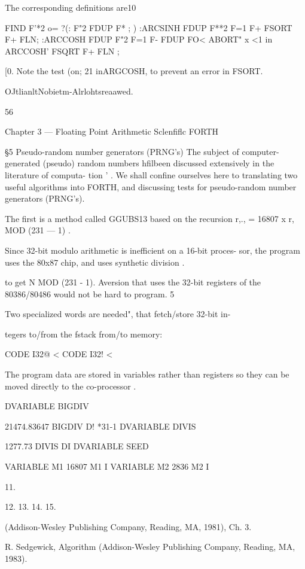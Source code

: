 The corresponding definitions are10

FIND F'*2 o= ?(: F"2 FDUP F* ; )
:ARCSINH FDUP F**2 F=1 F+
FSORT F+ FLN;
:ARCCOSH FDUP F"2 F=1 F-
FDUP FO<
ABORT" x <1 in ARCCOSH'
FSQRT F+ FLN ;

 

[0. Note the test (on; 21 inARGCOSH, to prevent an error in FSORT.

OJtlianltNobietm-Alrlohtsreaawed.

56

Chapter 3 — Floating Point Arithmetic Sclenfiﬂc FORTH

§5 Pseudo-random number generators (PRNG's)
The subject of computer-generated (pseudo) random numbers
hfilbeen discussed extensively in the literature of computa-
tion ' . We shall confine ourselves here to translating two useful
algorithms into FORTH, and discussing tests for pseudo-random
number generators (PRNG’s).

The first is a method called GGUBS13 based on the recursion
r,., = 16807 x r, MOD (231 — 1) .

Since 32-bit modulo arithmetic is inefficient on a 16-bit proces-
sor, the program uses the 80x87 chip, and uses synthetic division .

to get N MOD (231 - 1). Aversion that uses the 32-bit registers
of the 80386/80486 would not be hard to program. 5

 

Two specialized words are needed", that fetch/store 32-bit in-

tegers to/from the fstack from/to memory:

CODE I32@ <%
CODE I32! < %

The program data are stored in variables rather than registers so
they can be moved directly to the co-processor .

DVARIABLE BIGDIV

21474.83647 BIGDIV D! \2**31-1
DVARIABLE DIVIS

1277.73 DIVIS DI
DVARIABLE SEED

VARIABLE M1 16807 M1 I
VARIABLE M2 2836 M2 I

 

11.

12.
13.
14.
15.

(Addison-Wesley Publishing Company, Reading, MA, 1981), Ch. 3.

R. Sedgewick, Algorithm (Addison-Wesley Publishing Company, Reading, MA, 1983).

